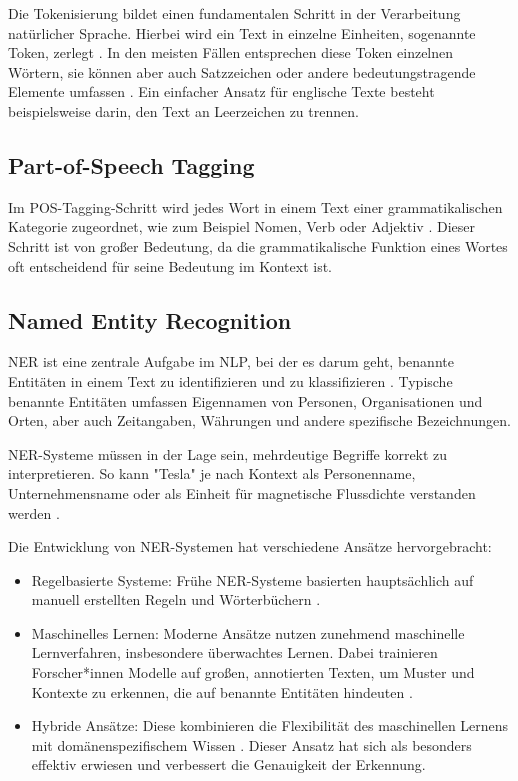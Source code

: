 Die Tokenisierung bildet einen fundamentalen Schritt in der Verarbeitung natürlicher Sprache. Hierbei wird ein Text in einzelne Einheiten, sogenannte Token, zerlegt \parencite{RebalaGopinath2019AItM}. In den meisten Fällen entsprechen diese Token einzelnen Wörtern, sie können aber auch Satzzeichen oder andere bedeutungstragende Elemente umfassen \parencite{RebalaGopinath2019AItM}. 
Ein einfacher Ansatz für englische Texte besteht beispielsweise darin, den Text an Leerzeichen zu trennen.

\subsection{Part-of-Speech Tagging}
\label{subsec:pos-tagging}

Im \gls{POS}-Tagging-Schritt wird jedes Wort in einem Text einer grammatikalischen Kategorie zugeordnet, wie zum Beispiel Nomen, Verb oder Adjektiv \parencite{RebalaGopinath2019AItM}. Dieser Schritt ist von großer Bedeutung, da die grammatikalische Funktion eines Wortes oft entscheidend für seine Bedeutung im Kontext ist.

\subsection{Named Entity Recognition}
\label{subsec:ner}

\gls{NER} ist eine zentrale Aufgabe im \gls{NLP}, bei der es darum geht, benannte Entitäten in einem Text zu identifizieren und zu klassifizieren \parencite{nadeau2007survey}. 
Typische benannte Entitäten umfassen Eigennamen von Personen, Organisationen und Orten, aber auch Zeitangaben, Währungen und andere spezifische Bezeichnungen.

\gls{NER}-Systeme müssen in der Lage sein, mehrdeutige Begriffe korrekt zu interpretieren. So kann "Tesla" je nach Kontext als Personenname, Unternehmensname oder als Einheit für magnetische Flussdichte verstanden werden \parencite{RebalaGopinath2019AItM}.

Die Entwicklung von \gls{NER}-Systemen hat verschiedene Ansätze hervorgebracht:

\begin{itemize}
	\item Regelbasierte Systeme: Frühe \gls{NER}-Systeme basierten hauptsächlich auf manuell erstellten Regeln und Wörterbüchern \parencite{nadeau2007survey}.
	\item Maschinelles Lernen: Moderne Ansätze nutzen zunehmend maschinelle Lernverfahren, insbesondere überwachtes Lernen. Dabei trainieren Forscher*innen Modelle auf großen, annotierten Texten, um Muster und Kontexte zu erkennen, die auf benannte Entitäten hindeuten \parencite{nadeau2007survey}.
	\item Hybride Ansätze: Diese kombinieren die Flexibilität des maschinellen Lernens mit domänenspezifischem Wissen \parencite{nadeau2007survey}. Dieser Ansatz hat sich als besonders effektiv erwiesen und verbessert die Genauigkeit der Erkennung.
\end{itemize}

